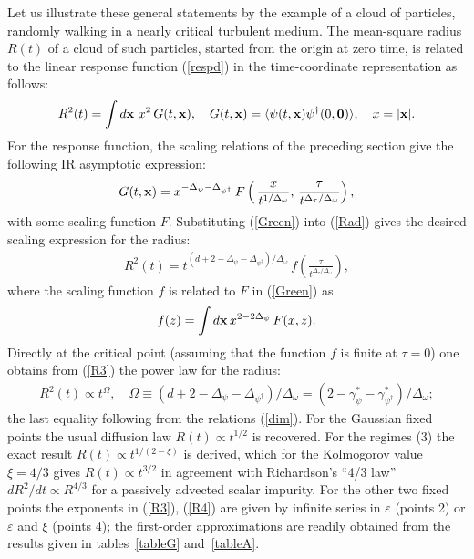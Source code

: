 \documentclass[12pt]{article}
\begin{document}
Let us illustrate these general statements by the example of a cloud of
particles, randomly walking in a nearly critical turbulent medium. The
mean-square radius $R(t)$ of a cloud of such particles, started from the
origin at zero time, is related to the linear response function
(\ref{respd}) in the time-coordinate representation as follows:
\begin{eqnarray}
R^{2}(t) = \int d{\bf x}\ x^{2}\, G(t,{\bf x}), \quad
G(t,{\bf x}) = \langle \psi (t,{\bf x}) \psi^{\dag} (0,{\bf 0}) \rangle,
\quad x=|{\bf x}|.
\label{Rad}
\end{eqnarray}
For the response function, the scaling relations of the preceding section
give the following IR asymptotic expression:
\begin{eqnarray}
G(t,{\bf x}) = x^{-\Delta_{\psi}-\Delta_{\psi^{\dag}}} \, F
\left(\, \frac{x} { t^ {1/\Delta_{\omega}} }, \,
\frac{\tau}{t^{\Delta_{\tau}/\Delta_{\omega}}}  \right),
\label{Green}
\end{eqnarray}
with some scaling function $F$. Substituting (\ref{Green}) into (\ref{Rad})
gives the desired scaling expression for the radius:
\begin{eqnarray}
R^2(t) = t^{ (d+2 -\Delta_{\psi}-\Delta_{\psi^{\dag}})/\Delta_{\omega} }
\, f \left( \frac{\tau}{t^{\Delta_{\tau}/\Delta_{\omega}}}  \right),
\label{R3}
\end{eqnarray}
where the scaling function $f$ is related to $F$ in (\ref{Green}) as
\[ f (z) = \int d{\bf x}\, x^{2-2\Delta_{\psi}} \, F(x,z). \]
Directly at the critical point (assuming that the function $f$ is finite
at $\tau=0$) one obtains from (\ref{R3}) the power law for the radius:
\begin{eqnarray}
R^2(t) \propto t^\Omega, \quad \Omega \equiv { (d+2
-\Delta_{\psi}-\Delta_{\psi^{\dag}})/ \Delta_{\omega} } =
{(2-\gamma_{\psi}^{*}-\gamma_{\psi^{\dag}}^{*})/\Delta_{\omega} };
\label{R4}
\end{eqnarray}
the last equality following from the relations (\ref{dim}). For the Gaussian
fixed points the usual diffusion law $R(t)\propto t^{1/2}$ is recovered.
For the regimes (3) the exact result $R(t)\propto t^{1/(2-\xi)}$ is derived,
which for the Kolmogorov value $\xi=4/3$ gives $R(t)\propto t^{3/2}$ in
agreement with Richardson's ``4/3 law'' $dR^{2}/dt \propto R^{4/3}$ for a
passively advected scalar impurity. For the other two fixed points the
exponents in (\ref{R3}), (\ref{R4}) are given by infinite series in
$\varepsilon$ (points 2) or $\varepsilon$ and $\xi$ (points 4); the
first-order approximations are readily obtained from the results given
in tables~\ref{tableG} and~\ref{tableA}.
\end{document}
